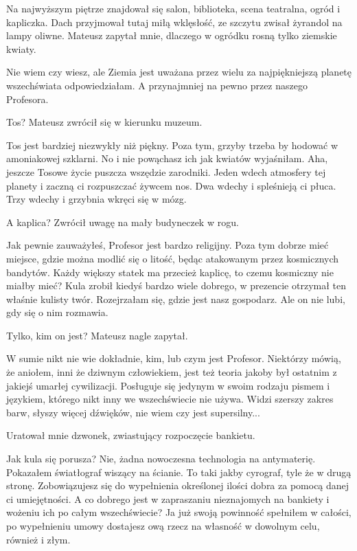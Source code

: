 Na najwyższym piętrze znajdował się salon, biblioteka, scena teatralna, ogród i kapliczka.
Dach przyjmował tutaj miłą wklęsłość, ze szczytu zwisał żyrandol na lampy oliwne.
Mateusz zapytał mnie, dlaczego w ogródku rosną tylko ziemskie kwiaty.

\ds{} Nie wiem czy wiesz, ale Ziemia jest uważana przez wielu za najpiękniejszą planetę wszechświata \dm{} odpowiedziałam. \dm{}
A przynajmniej na pewno przez naszego Profesora. \de{}

\ds{} Tos? \dm{} Mateusz zwrócił się w kierunku muzeum. \de{}

\ds{} Tos jest bardziej niezwykły niż piękny. Poza tym, grzyby trzeba by hodować w amoniakowej szklarni.
No i nie powąchasz ich jak kwiatów \ds{} wyjaśniłam. \dm{} Aha, jeszcze Tosowe życie puszcza wszędzie zarodniki. 
Jeden wdech atmosfery tej planety i zaczną ci rozpuszczać żywcem nos. Dwa wdechy i spleśnieją ci płuca. Trzy wdechy i grzybnia wkręci się w mózg. \de{}

\ds{} A kaplica? \dm{} Zwrócił uwagę na mały budyneczek w rogu. \de{}

\ds{} Jak pewnie zauważyłeś, Profesor jest bardzo religijny. Poza tym dobrze mieć miejsce, gdzie można modlić się o litość, będąc atakowanym przez kosmicznych bandytów. 
Każdy większy statek ma przecież kaplicę, to czemu kosmiczny nie miałby mieć? Kula zrobił kiedyś bardzo wiele dobrego, w prezencie otrzymał ten właśnie kulisty twór. \dm{}
Rozejrzałam się, gdzie jest nasz gospodarz. \dm{}
Ale on nie lubi, gdy się o nim rozmawia. \de{}

\ds{} Tylko, kim on jest? \dm{} Mateusz nagle zapytał. \de{}

\ds{} W sumie nikt nie wie dokładnie, kim, lub czym jest Profesor. Niektórzy mówią, że aniołem, inni że dziwnym człowiekiem,
jest też teoria jakoby był ostatnim z jakiejś umarłej cywilizacji. 
Posługuje się jedynym w swoim rodzaju pismem i językiem, którego nikt inny we wszechświecie nie używa.
Widzi szerszy zakres barw, słyszy więcej dźwięków, nie wiem czy jest supersilny... \de{}

Uratował mnie dzwonek, zwiastujący rozpoczęcie bankietu.



Jak kula się porusza? Nie, żadna nowoczesna technologia na antymaterię. Pokazałem światłograf wiszący na ścianie. To taki jakby cyrograf, tyle że w drugą stronę.
Zobowiązujesz się do wypełnienia określonej ilości dobra za pomocą danej ci umiejętności.
A co dobrego jest w zapraszaniu nieznajomych na bankiety i wożeniu ich po całym wszechświecie?
Ja już swoją powinność spełniłem w całości, po wypełnieniu umowy dostajesz ową rzecz na własność w dowolnym celu, również i złym.


